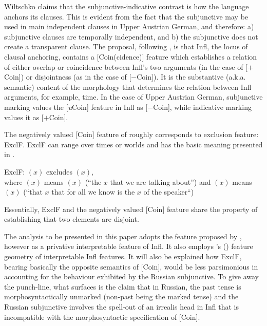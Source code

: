 \documentclass[output=paper,
modfonts,
newtxmath,
hidelinks,
]{langscibook}
\begin{document}
\noindent Wiltschko claims that the subjunctive-indicative contrast is how the language anchors its clauses. This is evident from the fact that the subjunctive may be used in main independent clauses in Upper Austrian German, and therefore: a) subjunctive clauses are temporally independent, and b) the subjunctive does not create a transparent clause. The proposal, following \citet{RitterWiltschko2005,RitterWiltschko2009}, is that Infl, the locus of clausal anchoring, contains a [Coin(cidence)] feature which establishes a relation of either overlap or coincidence between Infl’s two arguments (in the case of [$+$Coin]) or disjointness (as in the case of [$-$Coin]). It is the substantive (a.k.a. semantic) content of the morphology that determines the relation between Infl arguments, for example, time. In the case of Upper Austrian German, subjunctive marking values the [\textit{u}Coin] feature in Infl as [$-$Coin], while indicative marking values it as [$+$Coin].\largerpage

The negatively valued [Coin] feature of \citet{RitterWiltschko2005,RitterWiltschko2014} roughly corresponds to   exclusion feature: ExclF. ExclF can range over times or worlds and has the basic meaning presented in .

\ea \label{10:ex21}
ExclF: $(x)$ excludes $(x)$,\\where {}$(x)$ means $(x)$ (“the $x$ that we are talking about”) and $(x)$ means $(x)$ (“that $x$ that for all we know is the $x$ of the speaker“)
    \hfill \citep[246]{Iatridou2000}
	\z
\z

\noindent Essentially, ExclF and the negatively valued [Coin] feature share the property of establishing that two elements are disjoint.

The analysis to be presented in this paper adopts the feature proposed by \citet{RitterWiltschko2005,RitterWiltschko2009}, however as a privative interpretable feature of Infl. It also employs \citeauthor{Cowper2002}'s (\citeyear{Cowper2002,Cowper2005}) feature geometry of interpretable Infl features. It will also be explained how ExclF, bearing basically the opposite semantics of [Coin], would be less parsimonious in accounting for the behaviour exhibited by the Russian subjunctive. To give away the punch-line, what surfaces is the claim that in Russian, the past tense is morphosyntactically unmarked (non-past being the marked tense) and the Russian subjunctive involves the spell-out of an irrealis head in Infl that is incompatible with the morphosyntactic specification of [Coin]. 
\end{document}
